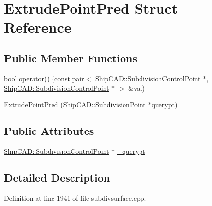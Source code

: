 \hypertarget{structExtrudePointPred}{\section{Extrude\-Point\-Pred Struct Reference}
\label{structExtrudePointPred}
}
\subsection*{Public Member Functions}
\begin{DoxyCompactItemize}
\item 
bool \hyperlink{structExtrudePointPred_ab8901a2a46f147e81c80c25b0492c772}{operator()} (const pair$<$ \hyperlink{classShipCAD_1_1SubdivisionControlPoint}{Ship\-C\-A\-D\-::\-Subdivision\-Control\-Point} $\ast$, \hyperlink{classShipCAD_1_1SubdivisionControlPoint}{Ship\-C\-A\-D\-::\-Subdivision\-Control\-Point} $\ast$ $>$ \&val)
\item 
\hyperlink{structExtrudePointPred_ac213b3b8d1bdc5a72e0a5a4ed53d9439}{Extrude\-Point\-Pred} (\hyperlink{classShipCAD_1_1SubdivisionPoint}{Ship\-C\-A\-D\-::\-Subdivision\-Point} $\ast$querypt)
\end{DoxyCompactItemize}
\subsection*{Public Attributes}
\begin{DoxyCompactItemize}
\item 
\hyperlink{classShipCAD_1_1SubdivisionControlPoint}{Ship\-C\-A\-D\-::\-Subdivision\-Control\-Point} $\ast$ \hyperlink{structExtrudePointPred_af9fa40238ef74aca6b8f8d7e303aafb4}{\-\_\-querypt}
\end{DoxyCompactItemize}


\subsection{Detailed Description}


Definition at line 1941 of file subdivsurface.\-cpp.



